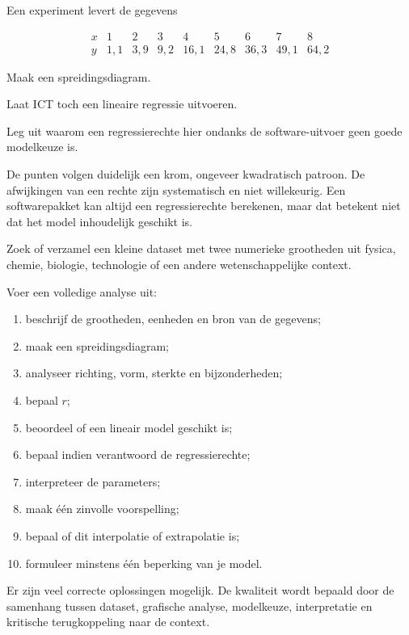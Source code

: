 \documentclass{ximera}
\begin{document}
\begin{oefening}{\oefG}

Een experiment levert de gegevens

\[
\begin{array}{c|rrrrrrrr}
x&1&2&3&4&5&6&7&8\\ \hline
y&1{,}1&3{,}9&9{,}2&16{,}1&24{,}8&36{,}3&49{,}1&64{,}2
\end{array}
\]

\begin{question}
Maak een spreidingsdiagram.
\end{question}

\begin{question}
Laat ICT toch een lineaire regressie uitvoeren.
\end{question}

\begin{question}
Leg uit waarom een regressierechte hier ondanks de software-uitvoer
geen goede modelkeuze is.

\begin{oplossing}
De punten volgen duidelijk een krom, ongeveer kwadratisch patroon.
De afwijkingen van een rechte zijn systematisch en niet willekeurig.
Een softwarepakket kan altijd een regressierechte berekenen, maar dat
betekent niet dat het model inhoudelijk geschikt is.
\end{oplossing}
\end{question}
\end{oefening}


\begin{oefening}{\oefG}
  
Zoek of verzamel een kleine dataset met twee numerieke grootheden uit
fysica, chemie, biologie, technologie of een andere wetenschappelijke
context.

Voer een volledige analyse uit:

\begin{enumerate}
  \item beschrijf de grootheden, eenheden en bron van de gegevens;
  \item maak een spreidingsdiagram;
  \item analyseer richting, vorm, sterkte en bijzonderheden;
  \item bepaal $r$;
  \item beoordeel of een lineair model geschikt is;
  \item bepaal indien verantwoord de regressierechte;
  \item interpreteer de parameters;
  \item maak één zinvolle voorspelling;
  \item bepaal of dit interpolatie of extrapolatie is;
  \item formuleer minstens één beperking van je model.
\end{enumerate}

\begin{oplossing}
Er zijn veel correcte oplossingen mogelijk. De kwaliteit wordt bepaald
door de samenhang tussen dataset, grafische analyse, modelkeuze,
interpretatie en kritische terugkoppeling naar de context.
\end{oplossing}
\end{oefening}
\end{document}

